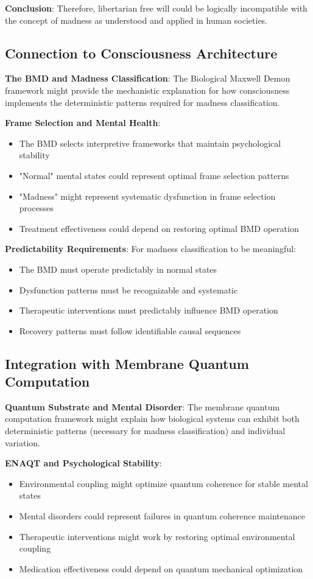 \documentclass[12pt]{article}
\begin{document}
{\textbf{Conclusion}: Therefore, libertarian free will could be logically incompatible with the concept of madness as understood and applied in human societies.

\subsection{Connection to Consciousness Architecture}

\textbf{The BMD and Madness Classification}: The Biological Maxwell Demon framework might provide the mechanistic explanation for how consciousness implements the deterministic patterns required for madness classification.

\textbf{Frame Selection and Mental Health}:
\begin{itemize}
\item The BMD selects interpretive frameworks that maintain psychological stability
\item "Normal" mental states could represent optimal frame selection patterns
\item "Madness" might represent systematic dysfunction in frame selection processes
\item Treatment effectiveness could depend on restoring optimal BMD operation
\end{itemize}

\textbf{Predictability Requirements}: For madness classification to be meaningful:
\begin{itemize}
\item The BMD must operate predictably in normal states
\item Dysfunction patterns must be recognizable and systematic
\item Therapeutic interventions must predictably influence BMD operation
\item Recovery patterns must follow identifiable causal sequences
\end{itemize}

\subsection{Integration with Membrane Quantum Computation}

\textbf{Quantum Substrate and Mental Disorder}: The membrane quantum computation framework might explain how biological systems can exhibit both deterministic patterns (necessary for madness classification) and individual variation.

\textbf{ENAQT and Psychological Stability}:
\begin{itemize}
\item Environmental coupling might optimize quantum coherence for stable mental states
\item Mental disorders could represent failures in quantum coherence maintenance
\item Therapeutic interventions might work by restoring optimal environmental coupling
\item Medication effectiveness could depend on quantum mechanical optimization
\end{itemize}

}
\end{document}
